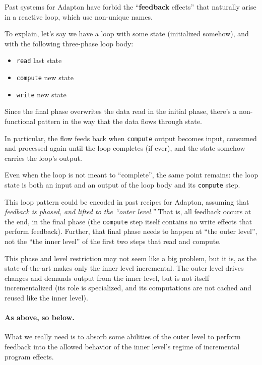 \documentclass[11pt]{article}
\begin{document}
Past systems for Adapton have forbid the ``\textbf{feedback} effects''
that naturally arise in a reactive loop, which use non-unique names.

To explain, let's say we have a loop with some state (initialized
somehow), and with the following three-phase loop body:

\begin{itemize}
\item \texttt{read} last state
\item \texttt{compute} new state
\item \texttt{write} new state
\end{itemize}

Since the final phase overwrites the data read in the initial phase,
there's a non-functional pattern in the way that the data flows
through state.

In particular, the flow feeds back when \texttt{compute} output
becomes input, consumed and processed again until the loop completes
(if ever), and the state somehow carries the loop's output.

Even when the loop is not meant to ``complete'', the same point
remains: the loop state is both an input and an output of the loop
body and its \texttt{compute} step.

This loop pattern could be encoded in past recipes for Adapton,
assuming that \emph{feedback is phased, and lifted to the ``outer level.''}
%
That is, all feedback occurs at the end, in the final phase (the
\texttt{compute} step itself contains no write effects that perform
feedback).
%
Further, that final phase needs to happen at ``the outer level'', not
the ``the inner level'' of the first two steps that read and compute.

This phase and level restriction may not seem like a big problem, but
it is, as the state-of-the-art makes only the inner level incremental.
%
The outer level drives changes and demands output from the inner
level, but is not itself incrementalized (its role is specialized, and
its computations are not cached and reused like the inner level).

\paragraph{As above, so below.}
%
What we really need is to absorb some abilities of the outer level to
perform feedback into the allowed behavior of the inner level's regime
of incremental program effects.
\end{document}
